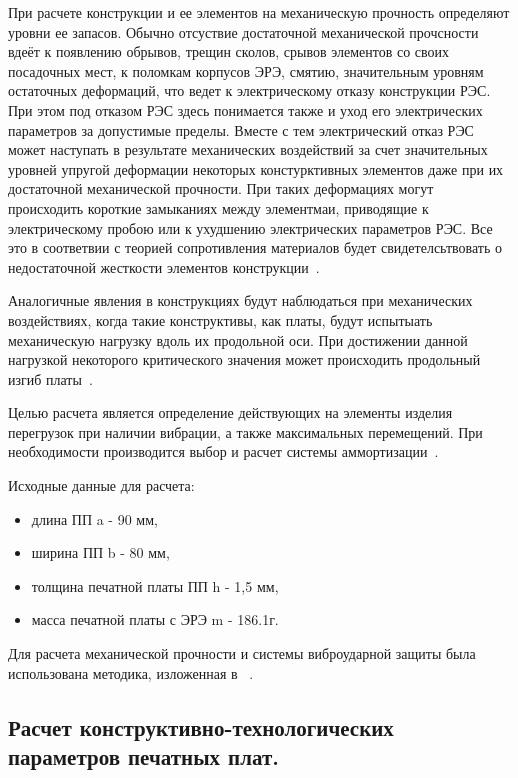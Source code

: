 При расчете конструкции и ее элементов на механическую прочность
определяют уровни ее запасов.  Обычно отсуствие достаточной
механической прочсности вдеёт к появлению обрывов, трещин сколов,
срывов элементов со своих посадочных мест, к поломкам корпусов ЭРЭ,
смятию, значительным уровням остаточных деформаций, что ведет к
электрическому отказу конструкции РЭС.
При этом под отказом РЭС здесь понимается также и уход его
электрических параметров за допустимые пределы. Вместе с тем
электрический отказ РЭС может наступать в результате механических
воздействий за счет значительных уровней упругой деформации некоторых
констурктивных элементов даже при их достаточной механической
прочности. При таких деформациях могут происходить короткие замыканиях
между элементмаи, приводящие к электрическому пробою или к ухудшению
электрических параметров РЭС. Все это в соответвии с теорией
сопротивления материалов будет свидетелсьтвовать о недостаточной
жесткости элементов конструкции~\cite{Kalenkovich1989}.

Аналогичные явления в конструкциях будут наблюдаться при механических
воздействиях, когда такие конструктивы, как платы, будут испытыать
механическую нагрузку вдоль их продольной оси.
При достижении данной нагрузкой некоторого критического значения может
происходить продольный изгиб платы~\cite{Kalenkovich1989}.

Целью расчета является определение действующих на элементы изделия
перегрузок при наличии вибрации, а также максимальных перемещений.
При необходимости производится выбор и расчет системы
аммортизации~\cite{Kalenkovich2012}.

Исходные данные для расчета:
\begin{itemize}
\item длина ПП a - 90 мм,
  
\item ширина ПП b - 80 мм,
  
\item толщина печатной платы ПП h - 1,5 мм,
  
\item масса печатной платы с ЭРЭ m - 186.1г.
\end{itemize}

Для расчета механической прочности и системы виброударной защиты была
использована методика, изложенная в ~\cite{Kostukevich2011}.

\subsection{Расчет конструктивно-технологических параметров печатных плат. }

